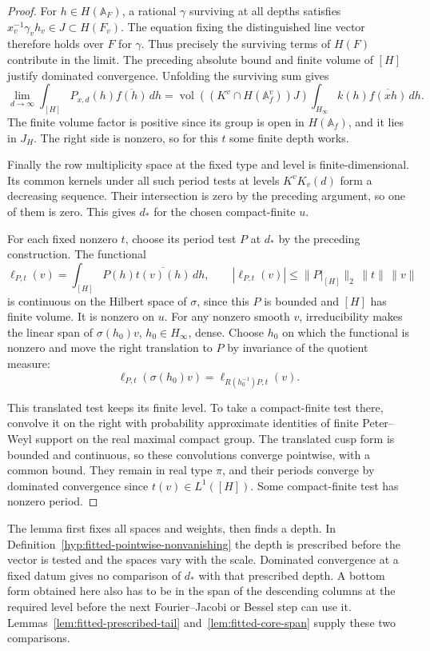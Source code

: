 \begin{proof}
For \(h\in H(\mathbb A_F)\), a rational \(\gamma\) surviving at all
depths satisfies \(x_v^{-1}\gamma_v h_v\in J\subset H(F_v)\).
The equation fixing the distinguished line vector therefore holds over
\(F\) for \(\gamma\). Thus precisely the surviving terms of \(H(F)\)
contribute in the limit. The preceding absolute bound and finite volume
of \([H]\) justify dominated convergence. Unfolding the surviving sum
gives
\[
 \lim_{d\to\infty}\int_{[H]}P_{x,d}(h)\overline{f(h)}\,dh
   =\operatorname{vol}\!\left((K^v\cap H(\mathbb A_f^v))J\right)
                \int_{H_\infty} k(h)\overline{f(xh)}\,dh .
\]
The finite volume factor is positive since its group is open in
\(H(\mathbb A_f)\), and it lies in \(J_H\). The right side is
nonzero, so for this \(t\) some finite depth works.

Finally the row multiplicity space at the fixed type and level is
finite-dimensional. Its common kernels under all such period tests
at levels \(K^vK_v(d)\) form a decreasing sequence. Their intersection
is zero by the preceding argument, so one of them is zero. This gives
\(d_*\) for the chosen compact-finite \(u\).

For each fixed nonzero \(t\), choose its period test \(P\) at
\(d_*\) by the preceding construction. The functional
\[
 \ell_{P,t}(v)=\int_{[H]}P(h)\overline{t(v)(h)}\,dh,
 \qquad |\ell_{P,t}(v)|\le\|P|_{[H]}\|_2\,\|t\|\,\|v\|
\]
is continuous on the Hilbert space of \(\sigma\), since this \(P\)
is bounded and \([H]\) has finite volume. It is nonzero on \(u\).
For any nonzero smooth \(v\), irreducibility makes the linear span
of \(\sigma(h_0)v\), \(h_0\in H_\infty\), dense. Choose \(h_0\)
on which the functional is nonzero and move the right translation
to \(P\) by invariance of the quotient measure:
\[
 \ell_{P,t}(\sigma(h_0)v)=\ell_{R(h_0^{-1})P,t}(v).
\]

This translated test keeps its finite level. To take a compact-finite
test there, convolve it on the right with probability approximate
identities of finite Peter--Weyl support on the real maximal compact
group. The translated cusp form is bounded and continuous, so these
convolutions converge pointwise, with a common bound. They remain in
real type \(\pi\), and their periods converge by dominated convergence
since \(t(v)\in L^1([H])\). Some compact-finite test has nonzero period.
\end{proof}

The lemma first fixes all spaces and weights, then finds a depth. In
Definition~\ref{hyp:fitted-pointwise-nonvanishing} the depth is
prescribed before the vector is tested and the spaces vary with the
scale. Dominated convergence at a fixed datum gives no comparison
of \(d_*\) with that prescribed depth. A bottom form obtained here
also has to be in the span of the descending columns at the required
level before the next Fourier--Jacobi or Bessel step can use it. Lemmas~\ref{lem:fitted-prescribed-tail} and~\ref{lem:fitted-core-span} supply these two comparisons.

